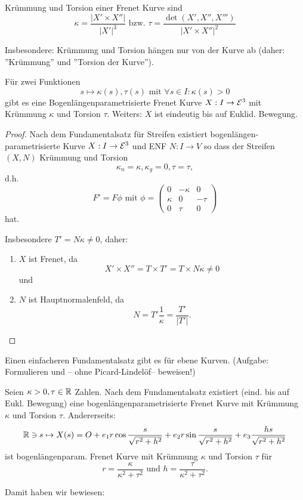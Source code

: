 \begin{remark}
	Krümmung und Torsion einer Frenet Kurve sind \[ \kappa = \frac{|X' \times X''|}{|X'|^3} \text{ bzw. }  \tau = \frac{\det(X',X'',X''')}{|X' \times X''|^2} \]
	
	Insbesondere: Krümmung und Torsion hängen nur von der Kurve ab (daher: ''Krümmung'' und ''Torsion der Kurve'').
\end{remark}

\begin{theorem}
	Für zwei Funktionen \[ s \mapsto \kappa(s), \tau(s) \text{ mit } \forall s \in I: \kappa(s) > 0 \] gibt es eine Bogenlängenparametrisierte Frenet Kurve $X: I \rightarrow \mathcal E ^3$ mit Krümmung $\kappa$ und Torsion $\tau$. 
	Weiters: $X$ ist eindeutig bis auf Euklid. Bewegung.
\end{theorem}

\begin{proof}
	Nach dem Fundamentalsatz für Streifen existiert bogenlängen-parametrisierte Kurve $X: I \rightarrow \mathcal E^3$ und ENF $N: I \rightarrow V$ so dass der Streifen $ (X,N)$ Krümmung und Torsion \[  \kappa_n = \kappa, \kappa_g = 0, \tau = \tau,  \] d.h.\[F' = F\phi \text{ mit } \phi = \begin{pmatrix}
	0 & - \kappa & 0\\
\kappa & 0 & - \tau \\
0 & \tau & 0
	\end{pmatrix} \] hat.
	
	Insbesondere $T' = N\kappa \not = 0$, daher:
	\begin{enumerate}
	\item $X$ ist Frenet, da
	\[ X' \times X'' = T \times T' = T \times N\kappa \not = 0 \]
	und \item  $N$ ist Hauptnormalenfeld, da \[ N = T'\frac{1}{\kappa} = \frac{T'}{|T'|}. \]
	
	\end{enumerate}
\end{proof}

\begin{remark}
	Einen einfacheren Fundamentalsatz gibt es für ebene Kurven. (Aufgabe: Formulieren und -- ohne Picard-Lindelöf-- beweisen!)
\end{remark}

\begin{example}
	Seien $\kappa > 0, \tau \in \mathbb R$ Zahlen. Nach dem Fundamentalsatz existiert (eind. bis auf Eukl. Bewegung) eine bogenlängenparametrisierte Frenet Kurve mit Krümmung $\kappa$ und Torsion $\tau$. Andererseits: \[ \mathbb R \ni s \mapsto X(s) = O + e_1 r \cos \frac{s}{\sqrt{r^2+h^2}} + e_2 r \sin \frac{s}{\sqrt{r^2+h^2}} + e_3 \frac{hs}{\sqrt{r^2 + h^2}}\] ist bogenlängenparam. Frenet Kurve mit Krümmung $\kappa$ und Torsion $\tau$ für \[ r= \frac{\kappa}{\kappa^2 + \tau^2} \text{ und } h = \frac{ \tau}{\kappa^2 + \tau^2}. \]
	
	Damit haben wir bewiesen:
\end{example}

